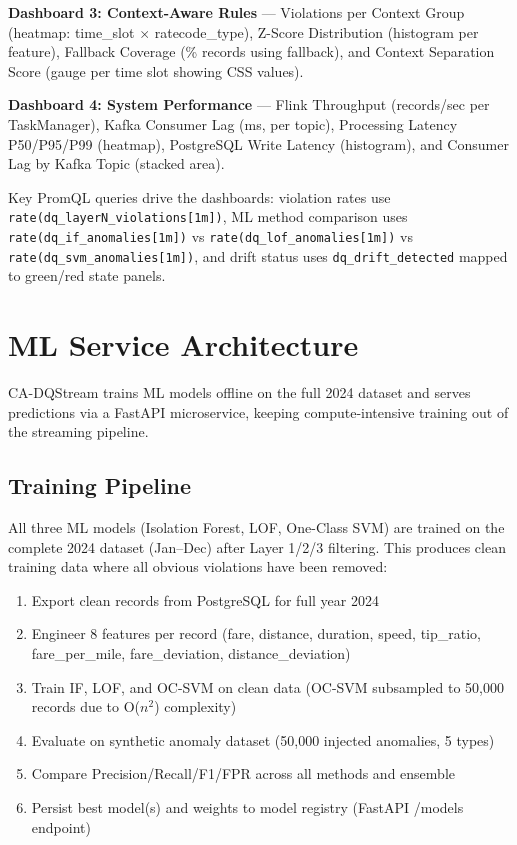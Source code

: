 \textbf{Dashboard 3: Context-Aware Rules} --- Violations per Context Group (heatmap: time\_slot $\times$ ratecode\_type), Z-Score Distribution (histogram per feature), Fallback Coverage (\% records using fallback), and Context Separation Score (gauge per time slot showing CSS values).

\textbf{Dashboard 4: System Performance} --- Flink Throughput (records/sec per TaskManager), Kafka Consumer Lag (ms, per topic), Processing Latency P50/P95/P99 (heatmap), PostgreSQL Write Latency (histogram), and Consumer Lag by Kafka Topic (stacked area).

Key PromQL queries drive the dashboards: violation rates use \texttt{rate(dq\_layerN\_violations[1m])}, ML method comparison uses \texttt{rate(dq\_if\_anomalies[1m])} vs \texttt{rate(dq\_lof\_anomalies[1m])} vs \texttt{rate(dq\_svm\_anomalies[1m])}, and drift status uses \texttt{dq\_drift\_detected} mapped to green/red state panels.

\section{ML Service Architecture}

CA-DQStream trains ML models offline on the full 2024 dataset and serves predictions via a FastAPI microservice, keeping compute-intensive training out of the streaming pipeline.

\subsection{Training Pipeline}

All three ML models (Isolation Forest, LOF, One-Class SVM) are trained on the complete 2024 dataset (Jan--Dec) after Layer 1/2/3 filtering. This produces clean training data where all obvious violations have been removed:

\begin{enumerate}
    \item Export clean records from PostgreSQL for full year 2024
    \item Engineer 8 features per record (fare, distance, duration, speed, tip\_ratio, fare\_per\_mile, fare\_deviation, distance\_deviation)
    \item Train IF, LOF, and OC-SVM on clean data (OC-SVM subsampled to 50,000 records due to O($n^2$) complexity)
    \item Evaluate on synthetic anomaly dataset (50,000 injected anomalies, 5 types)
    \item Compare Precision/Recall/F1/FPR across all methods and ensemble
    \item Persist best model(s) and weights to model registry (FastAPI /models endpoint)
\end{enumerate}

